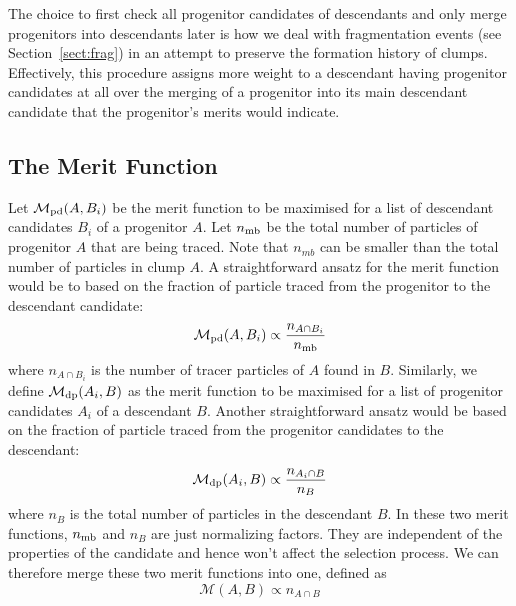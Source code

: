 The choice to first check all progenitor candidates of descendants and only
merge progenitors into descendants later is how we deal with fragmentation events 
(see Section~\ref{sect:frag}) in an attempt to preserve the formation history of clumps. 
Effectively, this procedure assigns more weight to a descendant having progenitor candidates 
at all over the merging of a progenitor into its main descendant candidate that the progenitor's 
merits would indicate.


\subsection{The Merit Function}

Let $\mathcal{M}_{\rm pd}(A,B_i)$ be the merit function to be
maximised for a list of descendant candidates $B_i$ of a progenitor
$A$. Let $n_{\rm mb}$ be the total number of particles of progenitor
$A$ that are being traced. Note that $n_{mb}$ can be smaller than the
total number of particles in clump $A$.  A straightforward ansatz for
the merit function would be to based on the fraction of particle traced from the
progenitor to the descendant candidate:
\begin{equation}
\mathcal{M}_{\rm pd}(A,B_i) \propto \frac{n_{A \cap B_i}}{n_{\rm mb}}
\end{equation}
where $n_{A \cap B_i}$ is the number of tracer particles of $A$ found
in $B$.  Similarly, we define $\mathcal{M}_{\rm dp}(A_i,B)$ as the
merit function to be maximised for a list of progenitor candidates
$A_i$ of a descendant $B$. Another straightforward ansatz would be
based on the fraction of particle traced from the progenitor
candidates to the descendant:
\begin{equation}
\mathcal{M}_{\rm dp}(A_i,B) \propto \frac{n_{A_i \cap B}}{n_B}
\end{equation}
where $n_B$ is the total number of particles in the descendant $B$.
In these two merit functions, $n_{\rm mb}$ and $n_B$ are just
normalizing factors. They are independent of the properties of the
candidate and hence won't affect the selection process.  We can
therefore merge these two merit functions into one, defined as
\begin{equation}
\mathcal{M}(A,B) \propto n_{A \cap B}
\end{equation}

